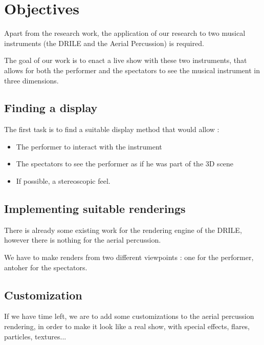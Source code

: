 \section{Objectives}
Apart from the research work, the application of our research to two musical instruments (the DRILE and the Aerial Percussion) is required.

The goal of our work is to enact a live show with these two instruments, that allows for both the performer and the spectators to see the musical instrument in three dimensions.

\subsection{Finding a display}
The first task is to find a suitable display method that would allow : 
\begin{itemize}
\item The performer to interact with the instrument
\item The spectators to see the performer as if he was part of the 3D scene
\item If possible, a stereoscopic feel.
\end{itemize}

\subsection{Implementing suitable renderings}
There is already some existing work for the rendering engine of the DRILE, however there is nothing for the aerial percussion.

We have to make renders from two different viewpoints : one for the performer, antoher for the spectators.

\subsection{Customization}
If we have time left, we are to add some customizations to the aerial percussion rendering, in order to make it look like a real show, with special effects, flares, particles, textures...
